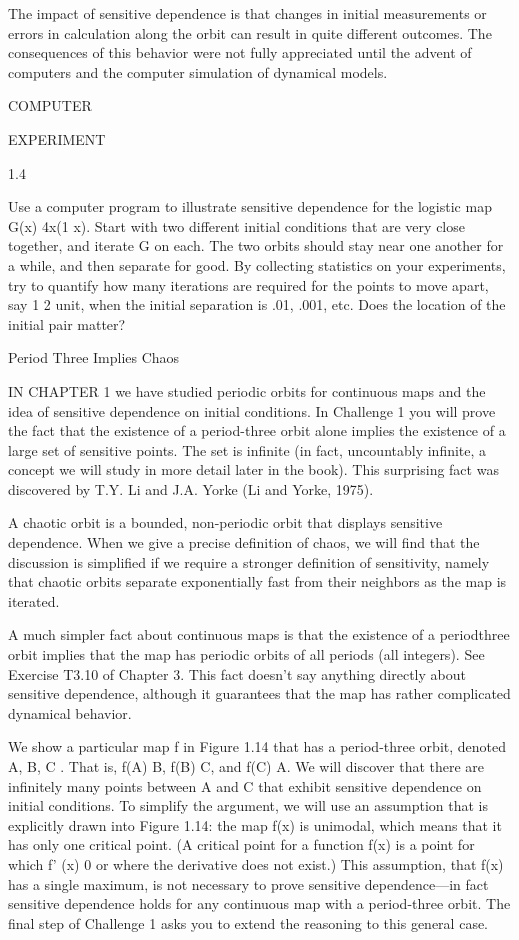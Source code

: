 \documentclass[12pt]{article}
\begin{document}
The impact of sensitive dependence is that changes in initial measurements or errors in calculation along 
the orbit can result in quite different outcomes. The consequences of this behavior were not fully 
appreciated until the advent of computers and the computer simulation of dynamical models.



COMPUTER

EXPERIMENT

1.4

Use a computer program to illustrate sensitive dependence for the logistic map G(x)  4x(1  x). Start with 
two different initial conditions that are very close together, and iterate G on each. The two orbits should 
stay near one another for a while, and then separate for good. By collecting statistics on your 
experiments, try to quantify how many iterations are required for the points to move apart, say 1  2 unit, 
when the initial separation is .01, .001, etc. Does the location of the initial pair matter?

Period Three Implies Chaos

IN CHAPTER 1 we have studied periodic orbits for continuous maps and the idea of sensitive dependence on 
initial conditions. In Challenge 1 you will prove the fact that the existence of a period-three orbit alone 
implies the existence of a large set of sensitive points. The set is infinite (in fact, uncountably 
infinite, a concept we will study in more detail later in the book). This surprising fact was discovered by 
T.Y. Li and J.A. Yorke (Li and Yorke, 1975).

A chaotic orbit is a bounded, non-periodic orbit that displays sensitive dependence. When we give a precise 
definition of chaos, we will find that the discussion is simplified if we require a stronger definition of 
sensitivity, namely that chaotic orbits separate exponentially fast from their neighbors as the map is 
iterated.

A much simpler fact about continuous maps is that the existence of a periodthree orbit implies that the map 
has periodic orbits of all periods (all integers). See Exercise T3.10 of Chapter 3. This fact doesn’t say 
anything directly about sensitive dependence, although it guarantees that the map has rather complicated 
dynamical behavior.

We show a particular map f in Figure 1.14 that has a period-three orbit, denoted A, B, C  . That is, f(A)  
B, f(B)  C, and f(C)  A. We will discover that there are infinitely many points between A and C that 
exhibit sensitive dependence on initial conditions. To simplify the argument, we will use an assumption 
that is explicitly drawn into Figure 1.14: the map f(x) is unimodal, which means that it has only one 
critical point. (A critical point for a function f(x) is a point for which f' (x)  0 or where the 
derivative does not exist.) This assumption, that f(x) has a single maximum, is not necessary to prove 
sensitive dependence—in fact sensitive dependence holds for any continuous map with a period-three orbit. 
The final step of Challenge 1 asks you to extend the reasoning to this general case.
\end{document}
